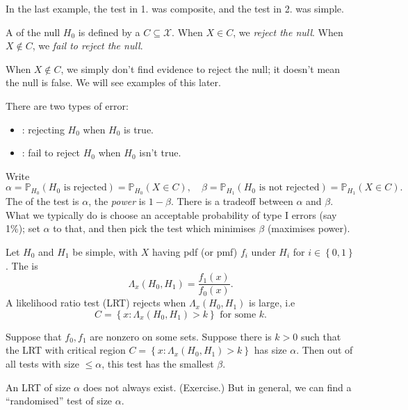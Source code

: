 \documentclass[egregdoesnotlikesansseriftitles,a4paper]{scrartcl}
\begin{document}
In the last example, the test in 1. was composite, and the test in 2. was simple.
\begin{definition*}[Test]
      A  of the null $H_0 $ is defined by a  $C \subseteq \mathcal{X}$. When $X \in C$, we \emph{reject the null}. When $X \notin C$, we \emph{fail to reject the null}.
      \begin{remark}
            When $X \notin C$, we simply don't find evidence to reject the null; it doesn't mean the null is false. We will see examples of this later.
      \end{remark}
\end{definition*}
\begin{definition*}[Error]
     There are two types of error:
     \begin{itemize}
          \item {}: rejecting $H_0 $ when $H_0 $ is true.
          \item {}: fail to reject $H_0 $ when $H_0 $ isn't true.
     \end{itemize}
\end{definition*}
Write \[
     \alpha =\mathbb{P}_{H_{0}}(H_0 \text{ is rejected} )=\mathbb{P}_{H_{0}} (X \in C), \quad \beta  =\mathbb{P}_{H_{1}}(H_0 \text{ is not rejected} )=\mathbb{P}_{H_{1}} (X \in C)
.\] The  of the test is $\alpha $, the \emph{power} is $1-\beta $. There is a tradeoff between $\alpha $ and $\beta $. What we typically do is choose an acceptable probability of type I errors (say 1\%); set $\alpha $ to that, and then pick the test which minimises $\beta $ (maximises power).
\begin{lemma}
      Let $H_0 $ and $H_1 $ be simple, with $X$ having pdf (or pmf) $f_{i}$ under $H_{i}$ for $i \in \left\{0,1\right\}$. The  is \[
      \Lambda_{x} (H_0 ,H_1 )= \frac{f_1 (x)}{f_0 (x)}
      .\] A likelihood ratio test (LRT) rejects when $\Lambda_{x} (H_0 ,H_1 )$ is large, i.e \[
      C= \left\{x: \Lambda_{x} (H_0 ,H_1 ) >k\right\} \text{ for some } k
      .\] 
\end{lemma}
\begin{theorem}
      Suppose that $f_0 ,f_1 $ are nonzero on some sets. Suppose there is $k >0$ such that the LRT with critical region $C= \left\{x: \Lambda_{x} (H_0 ,H_1 ) >k\right\}$ has size $\alpha $. Then out of all tests with size $\leq  \alpha $, this test has the smallest $\beta $. 
      \begin{remark}
            An LRT of size $\alpha $ does not always exist. (Exercise.) But in general, we can find a ``randomised'' test of size $\alpha $.
      \end{remark}
\end{theorem}
\end{document}
